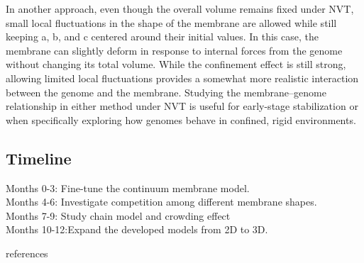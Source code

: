 \documentclass[12pt]{article}
\begin{document}
\begin{flushleft}
In another approach, even though the overall volume remains fixed under NVT, small local fluctuations in the shape of the membrane are allowed while still keeping a, b, and c centered around their initial values. In this case, the membrane can slightly deform in response to internal forces from the genome without changing its total volume. While the confinement effect is still strong, allowing limited local fluctuations provides a somewhat more realistic interaction between the genome and the membrane. Studying the membrane–genome relationship in either method under NVT is useful for early-stage stabilization or when specifically exploring how genomes behave in confined, rigid environments.

\subsection*{Timeline}
Months 0-3: Fine-tune the continuum membrane model.\\
Months 4-6: Investigate competition among different membrane shapes.\\
Months 7-9: Study chain model and crowding effect\\
Months 10-12:Expand the developed models from 2D to 3D.



\end{flushleft}


\newpage




 {references}  
\end{document}
